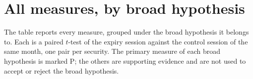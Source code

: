 \section{All measures, by broad hypothesis}\label{app:tests}

The table reports every measure, grouped under the broad hypothesis it belongs to. Each is a
paired $t$-test of the expiry session against the control session of the same month, one pair
per security. The primary measure of each broad hypothesis is marked P; the others are
supporting evidence and are not used to accept or reject the broad hypothesis.


